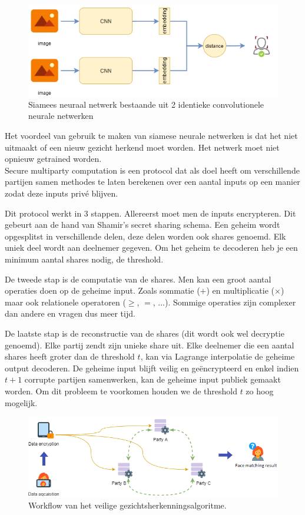 \begin{figure}[H]
  \includegraphics[width=\linewidth]{fig/siamese.png}
  \caption{Siamees neuraal netwerk bestaande uit 2 identieke convolutionele neurale netwerken}
  \label{fig:dutch_siamese}
\end{figure}

Het voordeel van gebruik te maken van siamese neurale netwerken is dat het niet uitmaakt of een nieuw gezicht herkend moet worden. Het netwerk moet niet opnieuw getrained worden.\\

Secure multiparty computation is een protocol dat als doel heeft om verschillende partijen samen methodes te laten berekenen over een aantal inputs op een manier zodat deze inputs priv\'e blijven.

Dit protocol werkt in 3 stappen. Allereerst moet men de inputs encrypteren. Dit gebeurt aan de hand van Shamir's secret sharing schema. Een geheim wordt opgesplitst in verschillende delen, deze delen worden ook shares genoemd. Elk uniek deel wordt aan deelnemer gegeven. Om het geheim te decoderen heb je een minimum aantal shares nodig, de threshold.

De tweede stap is de computatie van de shares. Men kan een groot aantal operaties doen op de geheime input. Zoals sommatie ($+$) en multiplicatie ($\times$) maar ook relationele operatoren ($\geq$, $=$, ...). Sommige operaties zijn complexer dan andere en vragen dus meer tijd.

De laatste stap is de reconstructie van de shares (dit wordt ook wel decryptie genoemd). Elke partij zendt zijn unieke share uit. Elke deelnemer die een aantal shares heeft groter dan de threshold $t$, kan via Lagrange interpolatie de geheime output decoderen. De geheime input blijft veilig en ge\"encrypteerd en enkel indien $t+1$ corrupte partijen samenwerken, kan de geheime input publiek gemaakt worden. Om dit probleem te voorkomen houden we de threshold $t$ zo hoog mogelijk.

\begin{figure}[H]
  \includegraphics[width=\linewidth]{fig/workflow.png}
  \caption{Workflow van het veilige gezichtsherkenningsalgoritme.}
  \label{fig:dutch_workflow}
\end{figure}

